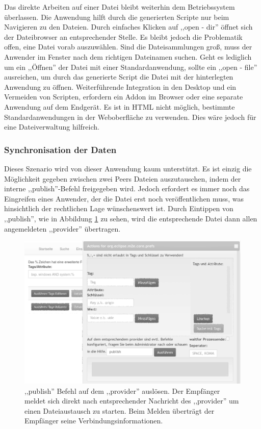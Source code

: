 \documentclass[oneside, ngerman, toc=bibliography,bibliography=totoc,listof=entryprefix, open=right,numbers=noenddot,fontsize=12pt]{scrbook}
\begin{document}
Das direkte Arbeiten auf einer Datei bleibt weiterhin dem Betriebssystem überlassen. Die Anwendung hilft durch die generierten Scripte nur beim Navigieren zu den Dateien. Durch einfaches Klicken auf ,,open - dir'' öffnet sich der Dateibrowser an entsprechender Stelle. Es bleibt jedoch die Problematik offen, eine Datei vorab auszuwählen. Sind die Dateisammlungen groß, muss der Anwender im Fenster nach dem richtigen Dateinamen suchen. Geht es lediglich um ein ,,Öffnen'' der Datei mit einer Standardanwendung, sollte ein ,,open - file'' ausreichen, um durch das generierte Script die Datei mit der hinterlegten Anwendung zu öffnen.
Weiterführende Integration in den Desktop und ein Vermeiden von Scripten, erfordern ein Addon im Browser oder eine separate Anwendung auf dem Endgerät. Es ist in HTML nicht möglich, bestimmte Standardanwendungen in der Weboberfläche zu verwenden. Dies wäre jedoch für eine Dateiverwaltung hilfreich.

 
\subsubsection{Synchronisation der Daten}
Dieses Szenario wird von dieser Anwendung kaum unterstützt. Es ist einzig die Möglichkeit gegeben zwischen zwei Peers Dateien auszutauschen, indem der interne ,,publish''-Befehl freigegeben wird. Jedoch erfordert es immer noch das Eingreifen eines Anwender, der die Datei erst noch veröffentlichen muss, was hinsichtlich der rechtlichen Lage wünschenswert ist. Durch Eintippen von ,,publish'', wie in Abbildung \ref{fig:www-cmd-pub} zu sehen, wird die entsprechende Datei dann allen angemeldeten ,,provider'' übertragen.

\begin{figure}[htbp] 
    \centering
    \includegraphics[width=\textwidth]{Masterarbeit_Bilder/www_cmd_publish.png}
    \caption{ ,,publish'' Befehl auf dem ,,provider'' auslösen. Der Empfänger meldet sich direkt nach entsprechender Nachricht des  ,,provider'' um einen Dateiaustausch zu starten. Beim Melden überträgt der Empfänger seine Verbindungsinformationen.}
    \label{fig:www-cmd-pub}
\end{figure}  
\end{document}
